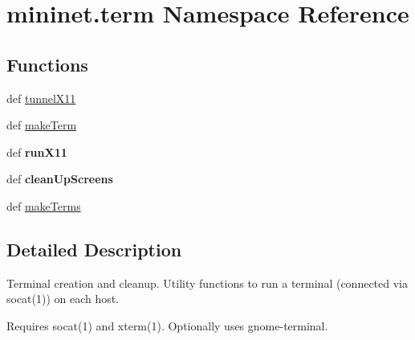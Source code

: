 \hypertarget{namespacemininet_1_1term}{\section{mininet.\-term Namespace Reference}
\label{namespacemininet_1_1term}
}
\subsection*{Functions}
\begin{DoxyCompactItemize}
\item 
def \hyperlink{namespacemininet_1_1term_a1d7f614c486348a1b0ae430941e9c597}{tunnel\-X11}
\item 
def \hyperlink{namespacemininet_1_1term_a95d48882130e9da57dd97cdaeadfd259}{make\-Term}
\item 
\hypertarget{namespacemininet_1_1term_a91cc8ddd130bacf9c9d9696d0a6e8079}{def {\bfseries run\-X11}}\label{namespacemininet_1_1term_a91cc8ddd130bacf9c9d9696d0a6e8079}

\item 
\hypertarget{namespacemininet_1_1term_a02db74d1352ce818782d9784915fcf03}{def {\bfseries clean\-Up\-Screens}}\label{namespacemininet_1_1term_a02db74d1352ce818782d9784915fcf03}

\item 
def \hyperlink{namespacemininet_1_1term_a9f7a8af31495e9133b89dc36e8c51ada}{make\-Terms}
\end{DoxyCompactItemize}


\subsection{Detailed Description}
\begin{DoxyVerb}Terminal creation and cleanup.
Utility functions to run a terminal (connected via socat(1)) on each host.

Requires socat(1) and xterm(1).
Optionally uses gnome-terminal.
\end{DoxyVerb}
 

